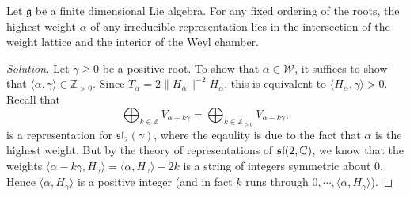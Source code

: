 \documentclass{report}
\begin{document}
\begin{exercise}\label{ex:highest_weight_inside_weyl_chamber}
    Let $\mathfrak g$ be a finite dimensional Lie algebra.
    For any fixed ordering of the roots, the highest weight $\alpha$ of any irreducible representation lies in the intersection of the weight lattice and the interior of the Weyl chamber.
\end{exercise}
\begin{proof}[Solution]
    Let $\gamma \geq 0$ be a positive root.
    To show that $\alpha \in \mathcal W$, it suffices to show that $\langle \alpha, \gamma \rangle \in \mathbb Z_{>0}$.
    Since $T_\alpha = 2\|H_\alpha\|^{-2} H_\alpha$, this is equivalent to $\langle H_\alpha, \gamma \rangle > 0$.
    Recall that
    \[
    \bigoplus_{ k \in \mathbb Z } V_{\alpha + k \gamma} = 
    \bigoplus_{ k \in \mathbb Z_{\geq 0} } V_{\alpha - k \gamma},
    \]
    is a representation for $\mathfrak{sl}_2(\gamma)$, where the eqaulity is due to the fact that $\alpha$ is the highest weight.
    But by the theory of representations of $\operatorname{{\mathfrak{sl}}}(2, \mathbb C)$, we know that the weights $\langle \alpha - k \gamma, H_\gamma \rangle = \langle \alpha, H_\gamma \rangle - 2k$ is a string of integers symmetric about $0$.
    Hence $\langle \alpha, H_\gamma \rangle$ is a positive integer (and in fact $k$ runs through $0, \cdots, \langle \alpha, H_\gamma \rangle$).
\end{proof}
\end{document}
